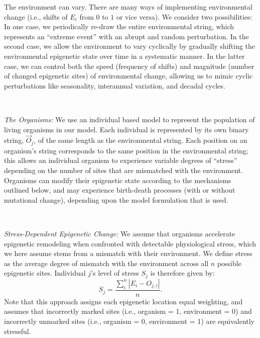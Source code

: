 \documentclass{article}
\begin{document}
The environment can vary. There are many ways of implementing environmental change (i.e., shifts of $E_i$ from $0$ to $1$ or vice versa). We consider two possibilities: In one case, we periodically re-draw the entire environmental string, which represents an ``extreme event'' with an abrupt and random perturbation. In the second case, we allow the environment to vary cyclically by gradually shifting the environmental epigenetic state over time in a systematic manner. In the latter case, we can control both the speed (frequency of shifts) and magnitude (number of changed epigenetic sites) of environmental change, allowing us to mimic cyclic perturbations like seasonality, interannual variation, and decadal cycles.

\ 


\noindent \textit{The Organisms:} We use an individual based model to represent the population of living organisms in our model. Each individual is represented by its own binary string, $\vec{O}_j$, of the same length as the environmental string. Each position on an organism's string corresponds to the same position in the environmental string; this allows an individual organism to experience variable degrees of ``stress'' depending on the number of sites that are mismatched with the environment. Organisms can modify their epigenetic state according to the mechanisms outlined below, and may experience birth-death processes (with or without mutational change), depending upon the model formulation that is used. %

\ 

\noindent \textit{Stress-Dependent Epigenetic Change:} We assume that organisms accelerate epigenetic remodeling when confronted with detectable physiological stress, which we here assume stems from a mismatch with their environment. We define stress as the average degree of mismatch with the environment across all $n$ possible epigenetic sites. Individual $j$'s level of stress $S_j$ is therefore given by:
\begin{equation}
   S_j = \frac{\sum_i ^n | E_i - O_{j,i} |}{n} .
\end{equation}
Note that this approach assigns each epigenetic location equal weighting, and assumes that incorrectly marked sites (i.e., organism = 1, environment = 0) and incorrectly unmarked sites (i.e., organism = 0, environment = 1) are equivalently stressful.
\end{document}
